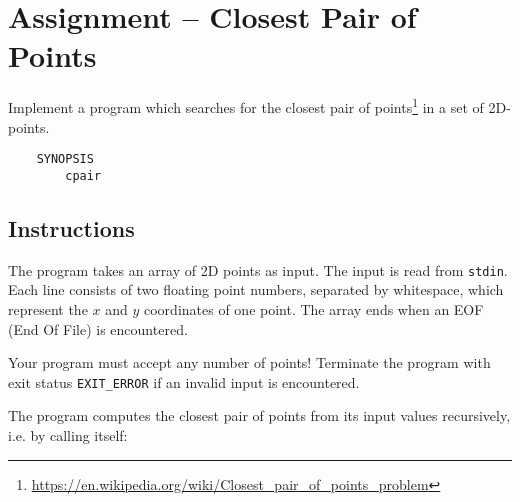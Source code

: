 
\usepackage{amsmath}
\usepackage{multicol}



\section*{Assignment -- Closest Pair of Points}
Implement a program which searches for the closest pair of points\footnote{\url{https://en.wikipedia.org/wiki/Closest\_pair\_of\_points\_problem}}
in a set of 2D-points.
\begin{verbatim}
    SYNOPSIS
        cpair
\end{verbatim}

\subsection*{Instructions}
The program takes an array of 2D points as input.
The input is read from \texttt{stdin}.
Each line consists of two floating point numbers,
separated by whitespace,
which represent the $x$ and $y$ coordinates of one point.
The array ends when an EOF (End Of File) is encountered.

Your program must accept any number of points!
Terminate the program with exit status \verb|EXIT_ERROR|
if an invalid input is encountered.

The program computes the closest pair of points from its input values recursively,
i.e. by calling itself:

